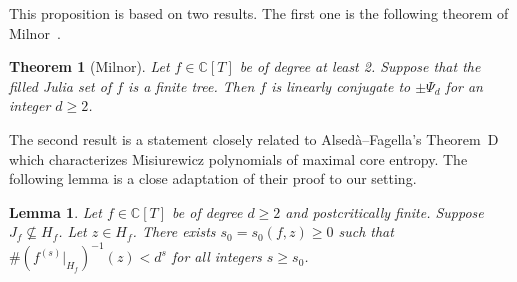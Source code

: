 \documentclass[12pt,oneside,a4]{amsart}
\newcommand{\IC}{\mathbb{C}}
\newcounter{maincounter}
\numberwithin{maincounter}{section}
\numberwithin{equation}{section}
\newtheorem{thm}[maincounter]{Theorem}
\newtheorem{lemma}[maincounter]{Lemma}
\renewcommand{\subset}{\subseteq}
\begin{document}
This proposition is based on two results. The first one is the
following theorem of Milnor~\cite[Lemma B.3]{Milnor:pasting}.

\begin{thm}[Milnor]
  \label{thm:chebpropn}
  Let $f\in\IC[T]$ be of degree at least 2. Suppose that
  the filled Julia set of $f$ is a finite tree. Then $f$ is linearly
  conjugate to $\pm\Psi_d$ for an integer $d\ge 2$.
\end{thm}


The second result is a statement closely related to
Alsed\`a--Fagella's Theorem~D~\cite{AlsedaFagella} which characterizes
Misiurewicz polynomials of maximal core entropy. The following lemma
is a close adaptation of their proof to our setting.

\begin{lemma}
  \label{lem:JfsubsetHf}
  Let $f\in \IC[T]$ be of degree $d \ge 2$ and postcritically finite.
  Suppose $J_f\not\subset H_f$. Let $z\in H_f$. There exists
  $s_0=s_0(f,z)\ge 0$ such that 
  $\#\left(f^{(s)}|_{H_f}\right)^{-1}(z)<d^s$ for all 
  integers $s\ge s_0$.
\end{lemma}
\end{document}
